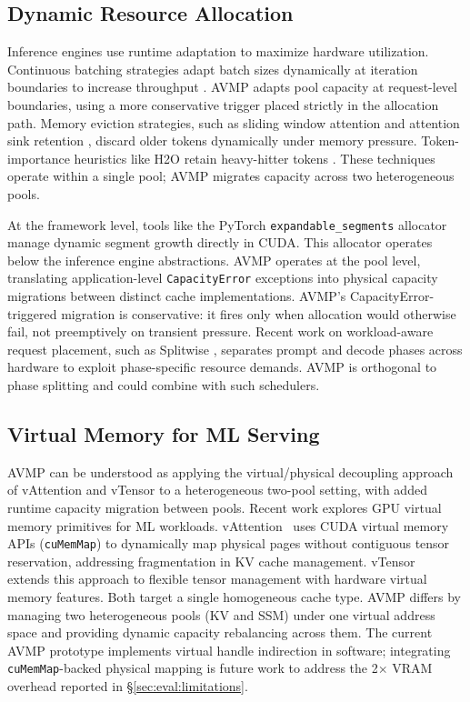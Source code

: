 \subsection{Dynamic Resource Allocation}
\label{sec:related:dynamic}

Inference engines use runtime adaptation to maximize hardware utilization. Continuous batching strategies adapt batch sizes dynamically at iteration boundaries to increase throughput \cite{yu2022orca}. AVMP adapts pool capacity at request-level boundaries, using a more conservative trigger placed strictly in the allocation path. Memory eviction strategies, such as sliding window attention and attention sink retention \cite{xiao2024streamingllm}, discard older tokens dynamically under memory pressure. Token-importance heuristics like H2O retain heavy-hitter tokens \cite{zhang2023h2o}. These techniques operate within a single pool; AVMP migrates capacity across two heterogeneous pools.

At the framework level, tools like the PyTorch \texttt{expandable\_segments} allocator manage dynamic segment growth directly in CUDA. This allocator operates below the inference engine abstractions. AVMP operates at the pool level, translating application-level \texttt{CapacityError} exceptions into physical capacity migrations between distinct cache implementations. AVMP's CapacityError-triggered migration is conservative: it fires only when allocation would otherwise fail, not preemptively on transient pressure. Recent work on workload-aware request placement, such as Splitwise \cite{patel2024splitwise}, separates prompt and decode phases across hardware to exploit phase-specific resource demands. AVMP is orthogonal to phase splitting and could combine with such schedulers.

\subsection{Virtual Memory for ML Serving}
\label{sec:related:virtmem}

AVMP can be understood as applying the virtual/physical decoupling approach of vAttention and vTensor to a heterogeneous two-pool setting, with added runtime capacity migration between pools. Recent work explores GPU virtual memory primitives for ML workloads. vAttention~\cite{prabhu2024vattention} uses CUDA virtual memory APIs (\texttt{cuMemMap}) to dynamically map physical pages without contiguous tensor reservation, addressing fragmentation in KV cache management. vTensor~\cite{xu2024vtensor} extends this approach to flexible tensor management with hardware virtual memory features. Both target a single homogeneous cache type. AVMP differs by managing two heterogeneous pools (KV and SSM) under one virtual address space and providing dynamic capacity rebalancing across them. The current AVMP prototype implements virtual handle indirection in software; integrating \texttt{cuMemMap}-backed physical mapping is future work to address the 2$\times$ VRAM overhead reported in \S\ref{sec:eval:limitations}.
